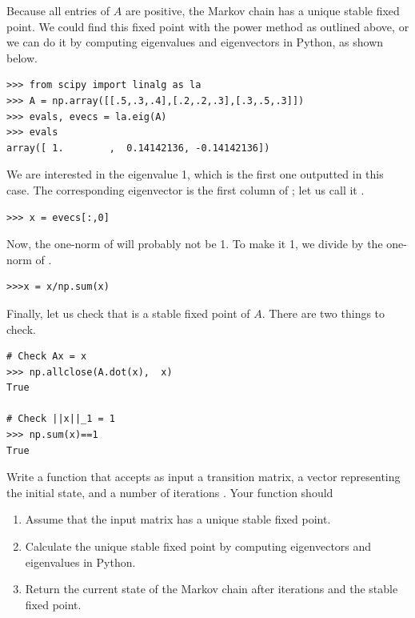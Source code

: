 Because all entries of $A$ are positive, the Markov chain has a unique stable fixed point. 
We could find this fixed point with the power method as outlined above, or we can do it by computing eigenvalues and eigenvectors in Python, as shown below.
\begin{lstlisting}
>>> from scipy import linalg as la
>>> A = np.array([[.5,.3,.4],[.2,.2,.3],[.3,.5,.3]])
>>> evals, evecs = la.eig(A)
>>> evals
array([ 1.        ,  0.14142136, -0.14142136])
\end{lstlisting}
We are interested in the eigenvalue 1, which is the first one outputted in this case. 
The corresponding eigenvector is the first column of ; let us call it .
\begin{lstlisting}
>>> x = evecs[:,0]
\end{lstlisting}
Now, the one-norm of  will probably not be 1. To make it 1, we divide by the one-norm of .
\begin{lstlisting}
>>>x = x/np.sum(x)
\end{lstlisting}
Finally, let us check that  is a stable fixed point of $A$. There are two things to check.
\begin{lstlisting}
# Check Ax = x
>>> np.allclose(A.dot(x),  x)
True

# Check ||x||_1 = 1
>>> np.sum(x)==1
True
\end{lstlisting}

\begin{problem}
Write a function that accepts as input a transition matrix, a vector representing the initial state, and a number of iterations . Your function should
\begin{enumerate}
\item Assume that the input matrix has a unique stable fixed point.
\item Calculate the unique stable fixed point by computing eigenvectors and eigenvalues in Python.
\item Return the current state of the Markov chain after  iterations and the stable fixed point.
\end{enumerate}
\label{prob:markov}
\end{problem}

